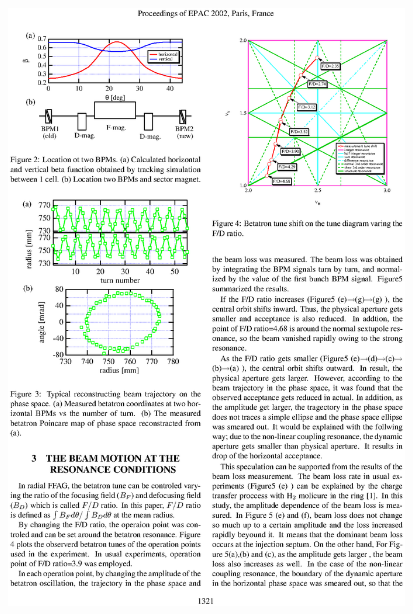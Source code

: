 \documentclass[12pt]{article}
\begin{document}
\begin{minipage}{.33\linewidth}
\hspace{5mm} \includegraphics*[bbllx=340,bblly=540,bburx=650,bbury=740,width=10.5cm]{./figs_FFAG_introSlides/dNudB.eps}

~~~~~~~~

~~~~~~~~~

~~~~~~~~~

~~~~~~~~~

\end{minipage}\hspace{0mm}
\end{document}
